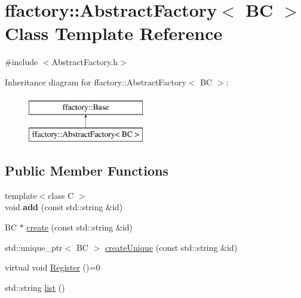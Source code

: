 \hypertarget{classffactory_1_1_abstract_factory}{\section{ffactory\-:\-:Abstract\-Factory$<$ B\-C $>$ Class Template Reference}
\label{classffactory_1_1_abstract_factory}
}


{\ttfamily \#include $<$Abstract\-Factory.\-h$>$}

Inheritance diagram for ffactory\-:\-:Abstract\-Factory$<$ B\-C $>$\-:\begin{figure}[H]
\begin{center}
\leavevmode
\includegraphics[height=2.000000cm]{classffactory_1_1_abstract_factory}
\end{center}
\end{figure}
\subsection*{Public Member Functions}
\begin{DoxyCompactItemize}
\item 
\hypertarget{classffactory_1_1_abstract_factory_a8223dea004ca4e4f78389729e886c4f4}{{\footnotesize template$<$class C $>$ }\\void {\bfseries add} (const std\-::string \&id)}\label{classffactory_1_1_abstract_factory_a8223dea004ca4e4f78389729e886c4f4}

\item 
B\-C $\ast$ \hyperlink{classffactory_1_1_abstract_factory_a822566f16b8bb4894f4930941b461ae8}{create} (const std\-::string \&id)
\item 
std\-::unique\-\_\-ptr$<$ B\-C $>$ \hyperlink{classffactory_1_1_abstract_factory_a50805631d6ed2790482d693b4388fe76}{create\-Unique} (const std\-::string \&id)
\item 
virtual void \hyperlink{classffactory_1_1_abstract_factory_acc3b114aecc19f8b4de596dba5bc7786}{Register} ()=0
\item 
std\-::string \hyperlink{classffactory_1_1_abstract_factory_ac34466fa6bbf769504437c90ae7b1a90}{list} ()
\end{DoxyCompactItemize}


